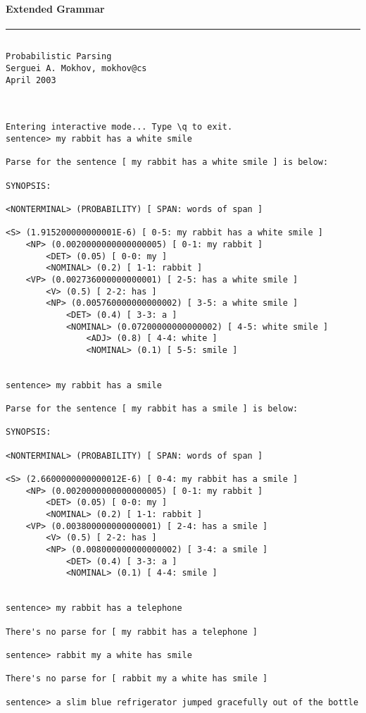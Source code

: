 \paragraph{Extended Grammar}

\tiny
\hrule\vskip4pt
\begin{verbatim}

Probabilistic Parsing
Serguei A. Mokhov, mokhov@cs
April 2003



Entering interactive mode... Type \q to exit.
sentence> my rabbit has a white smile

Parse for the sentence [ my rabbit has a white smile ] is below:

SYNOPSIS:

<NONTERMINAL> (PROBABILITY) [ SPAN: words of span ]

<S> (1.915200000000001E-6) [ 0-5: my rabbit has a white smile ]
    <NP> (0.0020000000000000005) [ 0-1: my rabbit ]
        <DET> (0.05) [ 0-0: my ]
        <NOMINAL> (0.2) [ 1-1: rabbit ]
    <VP> (0.002736000000000001) [ 2-5: has a white smile ]
        <V> (0.5) [ 2-2: has ]
        <NP> (0.005760000000000002) [ 3-5: a white smile ]
            <DET> (0.4) [ 3-3: a ]
            <NOMINAL> (0.07200000000000002) [ 4-5: white smile ]
                <ADJ> (0.8) [ 4-4: white ]
                <NOMINAL> (0.1) [ 5-5: smile ]


sentence> my rabbit has a smile

Parse for the sentence [ my rabbit has a smile ] is below:

SYNOPSIS:

<NONTERMINAL> (PROBABILITY) [ SPAN: words of span ]

<S> (2.6600000000000012E-6) [ 0-4: my rabbit has a smile ]
    <NP> (0.0020000000000000005) [ 0-1: my rabbit ]
        <DET> (0.05) [ 0-0: my ]
        <NOMINAL> (0.2) [ 1-1: rabbit ]
    <VP> (0.003800000000000001) [ 2-4: has a smile ]
        <V> (0.5) [ 2-2: has ]
        <NP> (0.008000000000000002) [ 3-4: a smile ]
            <DET> (0.4) [ 3-3: a ]
            <NOMINAL> (0.1) [ 4-4: smile ]


sentence> my rabbit has a telephone

There's no parse for [ my rabbit has a telephone ]

sentence> rabbit my a white has smile

There's no parse for [ rabbit my a white has smile ]

sentence> a slim blue refrigerator jumped gracefully out of the bottle


\end{verbatim}
